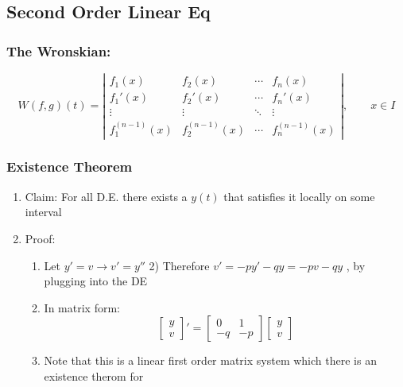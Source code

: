 \documentclass[11pt]{article}
\begin{document}
\subsection{Second Order Linear Eq}
\label{sec-9.2}

\subsubsection{The Wronskian:}
\label{sec-9.2.1}

\begin{equation}
W(f,g)(t) = \left |
\begin{array}{cccc}
         f_1(x) & f_2(x) & \cdots & f_n(x) \\
         f_1'(x) & f_2'(x) & \cdots & f_n' (x)\\
         \vdots & \vdots & \ddots & \vdots \\
         f_1^{(n-1)}(x)& f_2^{(n-1)}(x) & \cdots & f_n^{(n-1)}(x)
\end{array} \right |,\qquad x\in I
\end{equation}

\subsubsection{Existence Theorem}
\label{sec-9.2.2}

\begin{enumerate}
\item Claim: For all D.E. there exists a $y(t)$ that satisfies it
       locally on some interval
\item Proof:

\begin{enumerate}
\item Let $y'=v \rightarrow v'=y''$         2) Therefore $v'=-py'-qy=-pv-qy$ , by plugging into the DE
\item In matrix form:
           \begin{equation}
           \left [
           \begin{array}{c}
           y\\v
           \end{array} \right ]'=
           \left [
           \begin{array}{lr}
           0 & 1\\
           -q & -p
           \end{array} \right ]
           \left [
           \begin{array}{c}
           y\\v
           \end{array} \right ]
           \end{equation}
\item Note that this is a linear first order matrix system which there
           is an existence therom for
\end{enumerate}

\end{enumerate}
\end{document}
